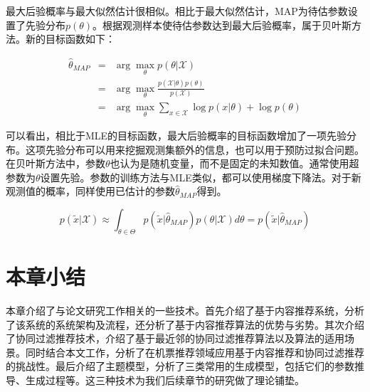 最大后验概率与最大似然估计很相似。相比于最大似然估计，MAP为待估参数设置了先验分布$p(\theta)$。根据观测样本使待估参数达到最大后验概率，属于贝叶斯方法。新的目标函数如下：

\begin{eqnarray}
	\hat{\theta}_{MAP} &=& \arg\max_\theta p(\theta|\mathcal{X}) \nonumber \\
	&=& \arg\max_\theta \frac{p(\mathcal{X}|\theta)p(\theta)}{p(\mathcal{X})} \nonumber \\
	&=& \arg\max_\theta {\sum_{x \in \mathcal{X}}\log p(x|\theta) + \log p(\theta)}
\end{eqnarray}

可以看出，相比于MLE的目标函数，最大后验概率的目标函数增加了一项先验分布。这项先验分布可以用来挖掘观测集额外的信息，也可以用于预防过拟合问题。在贝叶斯方法中，参数$\theta$也认为是随机变量，而不是固定的未知数值。通常使用超参数为$\theta$设置先验。参数的训练方法与MLE类似，都可以使用梯度下降法。对于新观测值的概率，同样使用已估计的参数$\hat{\theta}_{MAP}$得到。

\begin{equation}
p(\tilde{x}|\mathcal{X}) \approx \int_{\theta \in \Theta}p(\tilde{x}|\hat{\theta}_{MAP})p(\theta|\mathcal{X})d\theta = p(\tilde{x}|\hat{\theta}_{MAP})
\end{equation}
\fi

\section{本章小结}
本章介绍了与论文研究工作相关的一些技术。首先介绍了基于内容推荐系统，分析了该系统的系统架构及流程，还分析了基于内容推荐算法的优势与劣势。其次介绍了协同过滤推荐技术，介绍了基于最近邻的协同过滤推荐算法以及算法的适用场景。同时结合本文工作，分析了在机票推荐领域应用基于内容推荐和协同过滤推荐的挑战性。最后介绍了主题模型，分析了三类常用的生成模型，包括它们的参数推导、生成过程等。这三种技术为我们后续章节的研究做了理论铺垫。









